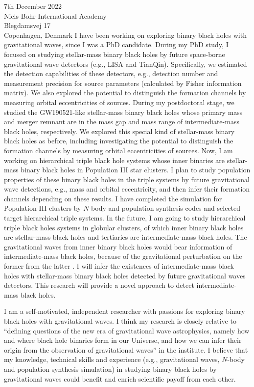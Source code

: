 \documentclass[11pt,a4paper,sans]{letter} %
\begin{document}
\begin{letter}{7th December 2022 \\
Niels Bohr International Academy\\
Blegdamsvej 17\\ 
Copenhagen, Denmark}
I have been working on exploring binary black holes with gravitational waves, since I was a PhD
    candidate. During my PhD study, I focused on studying stellar-mass binary black holes by future
    space-borne gravitational wave detectors (e.g., LISA and TianQin). Specifically, we estimated the detection
    capabilities of
    these detectors, e.g., detection number and measurement precision for source parameters (calculated by Fisher
    information matrix). We also explored the
    potential to distinguish the formation channels by measuring orbital eccentricities of sources. During my postdoctoral
    stage, we studied the GW190521-like stellar-mass binary black holes whose primary mass and merger remnant are in the
    mass gap and mass range of 
    intermediate-mass black holes, respectively. We explored this special kind of stellar-mass binary black holes as
    before, including investigating the potential to distinguish the formation
    channels by measuring orbital eccentricities of sources. 
    Now, I am working on
    hierarchical triple
    black hole systems whose inner binaries are stellar-mass binary black holes in Population III star clusters. I plan to
    study population properties of these binary black holes in the triple systems by future gravitational wave detections, e.g., mass and orbital eccentricity, and then
    infer their formation channels depending on these results. I have completed the simulation for Population III
    clusters by $N$-body and population synthesis codes and selected target hierarchical triple systems.  
    In the future, I am going to study hierarchical triple black holes systems in globular clusters, of which inner binary black holes are
    stellar-mass black holes and tertiaries are intermediate-mass black holes. The gravitational waves from inner binary
    black holes would bear information of intermediate-mass black holes, because of the gravitational perturbation on
    the former from the
    latter . I will infer the existences of
    intermediate-mass black holes with stellar-mass binary black holes detected by future gravitational waves detectors.
    This research will provide a novel approach to detect intermediate-mass black holes.

I am a self-motivated, independent researcher with
    passions for exploring binary black holes with gravitational waves. I think my research is closely relative to ``defining questions of the new era of gravitational wave astrophysics, namely how and where black hole binaries form
    in our Universe, and how we can infer their origin from the observation of gravitational waves'' in the
    institute. I believe that my knowledge,
    technical skills and experience (e.g., gravitational waves, $N$-body and population synthesis simulation) in studying binary black holes by
    gravitational waves could benefit and enrich scientific payoff
from each other. 


\end{letter}
\end{document}
